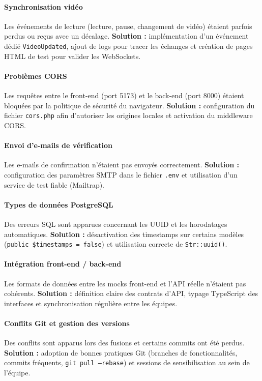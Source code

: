 \documentclass[12pt,a4paper]{report}
\begin{document}
\paragraph{Synchronisation vidéo}
Les événements de lecture (lecture, pause, changement de vidéo) étaient parfois perdus ou reçus avec un décalage.  
\textbf{Solution :} implémentation d’un événement dédié \texttt{VideoUpdated}, ajout de logs pour tracer les échanges et création de pages HTML de test pour valider les WebSockets.

\paragraph{Problèmes CORS}
Les requêtes entre le front-end (port 5173) et le back-end (port 8000) étaient bloquées par la politique de sécurité du navigateur.  
\textbf{Solution :} configuration du fichier \texttt{cors.php} afin d’autoriser les origines locales et activation du middleware CORS.

\paragraph{Envoi d’e-mails de vérification}
Les e-mails de confirmation n’étaient pas envoyés correctement.  
\textbf{Solution :} configuration des paramètres SMTP dans le fichier \texttt{.env} et utilisation d’un service de test fiable (Mailtrap).

\paragraph{Types de données PostgreSQL}
Des erreurs SQL sont apparues concernant les UUID et les horodatages automatiques.  
\textbf{Solution :} désactivation des timestamps sur certains modèles (\texttt{public \$timestamps = false}) et utilisation correcte de \texttt{Str::uuid()}.

\paragraph{Intégration front-end / back-end}
Les formats de données entre les mocks front-end et l’API réelle n’étaient pas cohérents.  
\textbf{Solution :} définition claire des contrats d’API, typage TypeScript des interfaces et synchronisation régulière entre les équipes.

\paragraph{Conflits Git et gestion des versions}
Des conflits sont apparus lors des fusions et certains commits ont été perdus.  
\textbf{Solution :} adoption de bonnes pratiques Git (branches de fonctionnalités, commits fréquents, \texttt{git pull --rebase}) et sessions de sensibilisation au sein de l’équipe.
\end{document}
